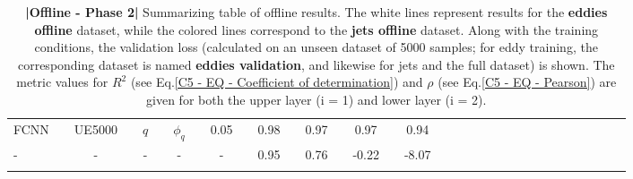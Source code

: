 \begin{table}[H]
\begin{tabular}{llclclclclclclclclclclclclclclcl}
FCNN      &  & UE5000      &  & $q$       &   & $\phi_q $                          &  & 0.05      &  & 0.98      &  & 0.97      &  & 0.97      &  & 0.94             \\ \rowcolor{Blue}
-     		&  & -                  &  & -            &   &  -                                         &  &  -           &  & 0.95      &  & 0.76      &  & -0.22    &  & -8.07             \\ [0.4em]
\Xhline{1.5pt}\\[-0.8em]      
\end{tabular}
\caption{\textbf{|}\textcolor{section_color}{\textbf{Offline - Phase 2}}\textbf{|} Summarizing table of offline results. The white lines represent results for the \textbf{eddies offline} dataset, while the colored lines correspond to the \textbf{jets offline} dataset. Along with the training conditions, the validation loss (calculated on an unseen dataset of 5000 samples; for eddy training, the corresponding dataset is named \textbf{eddies validation}, and likewise for jets and the full dataset) is shown. The metric values for $R^2$ (see Eq.\ref{C5 - EQ - Coefficient of determination}) and $\rho$ (see Eq.\ref{C5 - EQ - Pearson}) are given for both the upper layer (i = 1) and lower layer (i = 2).}
\label{C5 - TAB - PHASE 2}
\end{table}
\bgroup
